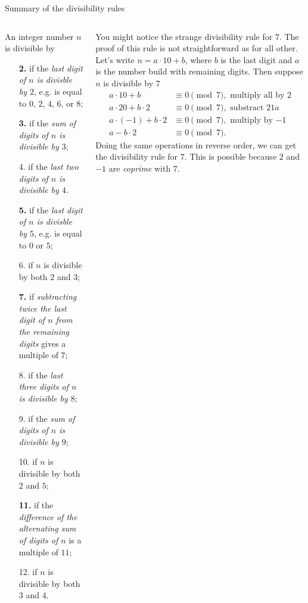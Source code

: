 \documentclass[9pt,aspectratio=169]{beamer}
\begin{document}
\begin{frame}{Summary of the divisibility rules}
  \begin{columns}[T]
    \begin{column}{0.5\textwidth}
      An integer number $n$ is divisible by
      \begin{enumerate}
        \item[\textbf{2.}] if the \emph{last digit of $n$ is divisble by $2$}, e.g. is equal to $0$, $2$, $4$, $6$, or $8$;
        \item[\textbf{3.}] if the \emph{sum of digits of $n$ is divisible by $3$};
        \item[4.] if the \emph{last two digits of $n$ is divisible by $4$}.\item[\textbf{5.}] if the \emph{last digit of $n$ is divisble by $5$}, e.g. is equal to $0$ or $5$;
        \item[6.] if $n$ is divisible by both $2$ and $3$;
        \item[\textbf{7.}] if \emph{subtracting twice the last digit of $n$ from the remaining digits} gives a multiple of $7$;
        \item[8.] if the \emph{last three digits of $n$ is divisible by $8$};
        \item[9.] if the \emph{sum of digits of $n$ is divisible by $9$};
        \item[10.] if $n$ is divisible by both $2$ and $5$;
        \item[\textbf{11.}] if the \emph{difference of the alternating sum of digits of $n$} is a multiple of $11$;
        \item[12.] if $n$ is divisible by both $3$ and $4$.
      \end{enumerate}
    \end{column}
    \begin{column}{0.5\textwidth}
      {\small
      You might notice the strange divisibility rule for $7$. The proof of this rule is not straightforward as for all other. Let's write $n = a\cdot 10 + b$, where $b$ is the last digit and $a$ is the number build with remaining digits. Then suppose $n$ is divisible by $7$
      \begin{align*}
        a \cdot 10 + b &\equiv 0 \pmod{7}, \text{ multiply all by $2$}\\
        a \cdot 20 + b \cdot 2 &\equiv 0 \pmod{7}, \text{ substract $21a$}\\
        a \cdot (-1) + b \cdot 2 &\equiv 0 \pmod{7}, \text{ multiply by $-1$}\\
        a - b \cdot 2 &\equiv 0 \pmod{7}.
      \end{align*}
      Doing the same operations in reverse order, we can get the divisibility rule for $7$. This is possible because $2$ and $-1$ are \emph{coprime} with $7$. 
      
}
\end{column}
\end{columns}
\end{frame}
\end{document}
